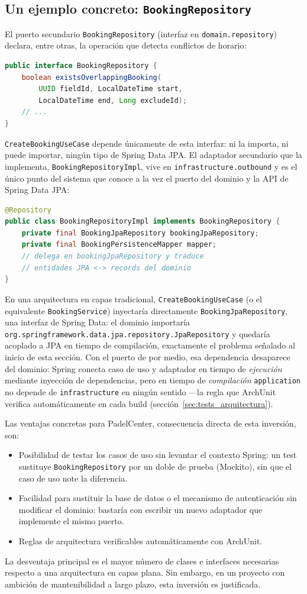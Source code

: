 \subsection{Un ejemplo concreto: \texttt{BookingRepository}}

El puerto secundario \texttt{BookingRepository} (interfaz en
\texttt{domain.repository}) declara, entre otras, la operación que detecta
conflictos de horario:

\begin{lstlisting}[language=Java]
public interface BookingRepository {
    boolean existsOverlappingBooking(
        UUID fieldId, LocalDateTime start,
        LocalDateTime end, Long excludeId);
    // ...
}
\end{lstlisting}

\texttt{CreateBookingUseCase} depende únicamente de esta interfaz: ni la
importa, ni puede importar, ningún tipo de Spring Data JPA. El adaptador
secundario que la implementa, \texttt{BookingRepositoryImpl}, vive en
\texttt{infrastructure.outbound} y es el único punto del sistema que conoce a
la vez el puerto del dominio y la API de Spring Data JPA:

\begin{lstlisting}[language=Java]
@Repository
public class BookingRepositoryImpl implements BookingRepository {
    private final BookingJpaRepository bookingJpaRepository;
    private final BookingPersistenceMapper mapper;
    // delega en bookingJpaRepository y traduce
    // entidades JPA <-> records del dominio
}
\end{lstlisting}

En una arquitectura en capas tradicional, \texttt{CreateBookingUseCase} (o el
equivalente \texttt{BookingService}) inyectaría directamente
\texttt{BookingJpaRepository}, una interfaz de Spring Data: el dominio
importaría \texttt{org.springframework\-.data\-.jpa\-.repository\-.JpaRepository} y
quedaría acoplado a JPA en tiempo de compilación, exactamente el problema
señalado al inicio de esta sección. Con el puerto de por medio, esa dependencia
desaparece del dominio: Spring conecta caso de uso y adaptador en tiempo de
\emph{ejecución} mediante inyección de dependencias, pero en tiempo de
\emph{compilación} \texttt{application} no depende de \texttt{infrastructure}
en ningún sentido —la regla que ArchUnit verifica automáticamente en cada
build (sección~\ref{sec:tests_arquitectura}).

Las ventajas concretas para PadelCenter, consecuencia directa de esta
inversión, son:
\begin{itemize}
  \item Posibilidad de testar los casos de uso sin levantar el contexto Spring:
        un test sustituye \texttt{BookingRepository} por un doble de prueba
        (Mockito), sin que el caso de uso note la diferencia.
  \item Facilidad para sustituir la base de datos o el mecanismo de autenticación
        sin modificar el dominio: bastaría con escribir un nuevo adaptador que
        implemente el mismo puerto.
  \item Reglas de arquitectura verificables automáticamente con ArchUnit.
\end{itemize}

La desventaja principal es el mayor número de clases e interfaces necesarias
respecto a una arquitectura en capas plana. Sin embargo, en un proyecto con
ambición de mantenibilidad a largo plazo, esta inversión es justificada.
